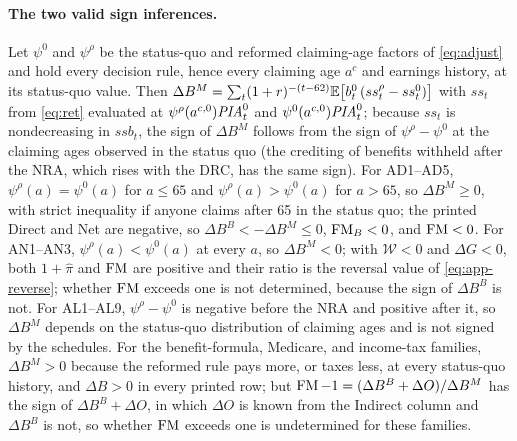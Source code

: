 \paragraph{The two valid sign inferences.}
Let $\psi^{0}$ and $\psi^{\rho}$ be the status-quo and reformed claiming-age factors of \eqref{eq:adjust} and hold every decision rule, hence every claiming age $a^{c}$ and earnings history, at its status-quo value. Then $\Delta B^{M}=\sum_t(1+r)^{-(t-62)}{\mathbb E}\bigl[b^{0}_t\,(ss^{\rho}_t-ss^{0}_t)\bigr]$ with $ss_t$ from \eqref{eq:ret} evaluated at $\psi^{\rho}(a^{c,0})\mathit{PIA}^{0}_t$ and $\psi^{0}(a^{c,0})\mathit{PIA}^{0}_t$; because $ss_t$ is nondecreasing in $ssb_t$, the sign of $\Delta B^{M}$ follows from the sign of $\psi^{\rho}-\psi^{0}$ at the claiming ages observed in the status quo (the crediting of benefits withheld after the NRA, which rises with the DRC, has the same sign). For AD1--AD5, $\psi^{\rho}(a)=\psi^{0}(a)$ for $a\le65$ and $\psi^{\rho}(a)>\psi^{0}(a)$ for $a>65$, so $\Delta B^{M}\ge0$, with strict inequality if anyone claims after 65 in the status quo; the printed Direct and Net are negative, so $\Delta B^{B}<-\Delta B^{M}\le0$, $\operatorname{FM}_B<0$, and $\operatorname{FM}<0$.
For AN1--AN3, $\psi^{\rho}(a)<\psi^{0}(a)$ at every $a$, so $\Delta B^{M}<0$; with $\mathcal{W}<0$ and $\Delta G<0$, both $1+\hat\pi$ and $\operatorname{FM}$ are positive and their ratio is the reversal value of \eqref{eq:app-reverse}; whether $\operatorname{FM}$ exceeds one is not determined, because the sign of $\Delta B^{B}$ is not.
For AL1--AL9, $\psi^{\rho}-\psi^{0}$ is negative before the NRA and positive after it, so $\Delta B^{M}$ depends on the status-quo distribution of claiming ages and is not signed by the schedules. For the benefit-formula, Medicare, and income-tax families, $\Delta B^{M}>0$ because the reformed rule pays more, or taxes less, at every status-quo history, and $\Delta B>0$ in every printed row; but $\operatorname{FM}-1=(\Delta B^{B}+\Delta O)/\Delta B^{M}$ has the sign of $\Delta B^{B}+\Delta O$, in which $\Delta O$ is known from the Indirect column and $\Delta B^{B}$ is not, so whether $\operatorname{FM}$ exceeds one is undetermined for these families.

